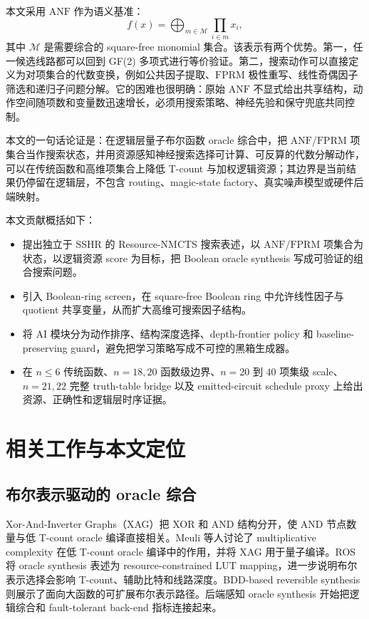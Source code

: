 \documentclass[UTF8,fontset=macnew,11pt]{ctexart}
\newcommand{\method}{Resource-NMCTS}
\newcommand{\screen}{Boolean-ring screen}
\newcommand{\anf}{\ensuremath{\mathrm{ANF}}}
\newcommand{\fprm}{\ensuremath{\mathrm{FPRM}}}
\newcommand{\ttable}{truth-table}
\begin{document}
本文采用 \anf{} 作为语义基准：
\begin{equation}
  f(x)=\bigoplus_{m\in\mathcal{M}}\prod_{i\in m}x_i ,
  \label{eq:anf}
\end{equation}
其中 $\mathcal{M}$ 是需要综合的 square-free monomial 集合。该表示有两个优势。第一，任一候选线路都可以回到 GF(2) 多项式进行等价验证。第二，搜索动作可以直接定义为对项集合的代数变换，例如公共因子提取、\fprm{} 极性重写、线性奇偶因子筛选和递归子问题分解。它的困难也很明确：原始 \anf{} 不显式给出共享结构，动作空间随项数和变量数迅速增长，必须用搜索策略、神经先验和保守兜底共同控制。

本文的一句话论证是：在逻辑层量子布尔函数 oracle 综合中，把 \anf{}/\fprm{} 项集合当作搜索状态，并用资源感知神经搜索选择可计算、可反算的代数分解动作，可以在传统函数和高维项集合上降低 T-count 与加权逻辑资源；其边界是当前结果仍停留在逻辑层，不包含 routing、magic-state factory、真实噪声模型或硬件后端映射。

本文贡献概括如下：
\begin{itemize}
  \item 提出独立于 SSHR 的 \method{} 搜索表述，以 \anf{}/\fprm{} 项集合为状态，以逻辑资源 score 为目标，把 Boolean oracle synthesis 写成可验证的组合搜索问题。
  \item 引入 \screen{}，在 square-free Boolean ring 中允许线性因子与 quotient 共享变量，从而扩大高维可搜索因子结构。
  \item 将 AI 模块分为动作排序、结构深度选择、depth-frontier policy 和 baseline-preserving guard，避免把学习策略写成不可控的黑箱生成器。
  \item 在 $n\leq6$ 传统函数、$n=18,20$ 函数级边界、$n=20$ 到 $40$ 项集级 scale、$n=21,22$ 完整 \ttable{} bridge 以及 emitted-circuit schedule proxy 上给出资源、正确性和逻辑层时序证据。
\end{itemize}

\section{相关工作与本文定位}

\subsection{布尔表示驱动的 oracle 综合}

Xor-And-Inverter Graphs（XAG）把 XOR 和 AND 结构分开，使 AND 节点数量与低 T-count oracle 编译直接相关。Meuli 等人讨论了 multiplicative complexity 在低 T-count oracle 编译中的作用\cite{meuli2019multiplicative}，并将 XAG 用于量子编译\cite{meuli2022xag}。ROS 将 oracle synthesis 表述为 resource-constrained LUT mapping\cite{meuli2020ros}，进一步说明布尔表示选择会影响 T-count、辅助比特和线路深度。BDD-based reversible synthesis 则展示了面向大函数的可扩展布尔表示路径\cite{wille2009bdd}。后端感知 oracle synthesis 开始把逻辑综合和 fault-tolerant back-end 指标连接起来\cite{yu2025backend}。
\end{document}
